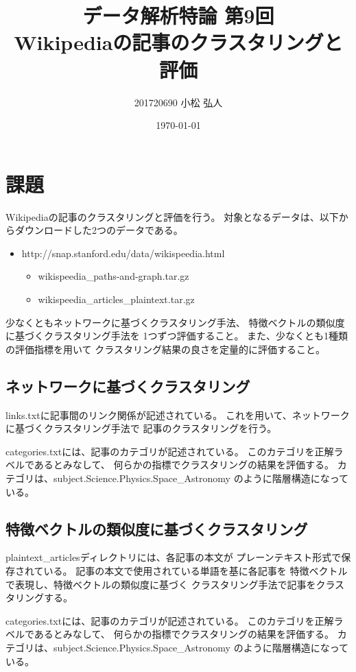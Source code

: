 \documentclass{jsarticle}
\title{データ解析特論 第9回\\Wikipediaの記事のクラスタリングと評価}
\author{201720690 小松 弘人}
\date{\today}
\makeatletter
\def\maketitle{%
    \null
    \thispagestyle{empty}%
    \vfill
    \begin{center}\leavevmode
        \normalfont
        {\LARGE \@title\par}%
        \vskip 1cm
        {\Large \@author\par}%
        \vskip 1cm
        {\Large \@date\par}%
    \end{center}%
    \vfill
    \null
    \@thanks%
    \cleardoublepage
}
\makeatother
\begin{document}
\maketitle
\thispagestyle{empty}
\section{課題}
Wikipediaの記事のクラスタリングと評価を行う。
対象となるデータは、以下からダウンロードした2つのデータである。
\begin{itemize}
    \item http://snap.stanford.edu/data/wikispeedia.html
    \begin{itemize}
        \item wikispeedia\_paths-and-graph.tar.gz
        \item wikispeedia\_articles\_plaintext.tar.gz
    \end{itemize}
\end{itemize}
少なくともネットワークに基づくクラスタリング手法、
特徴ベクトルの類似度に基づくクラスタリング手法を
1つずつ評価すること。
また、少なくとも1種類の評価指標を用いて
クラスタリング結果の良さを定量的に評価すること。

\subsection{ネットワークに基づくクラスタリング}
links.txtに記事間のリンク関係が記述されている。
これを用いて、ネットワークに基づくクラスタリング手法で
記事のクラスタリングを行う。

categories.txtには、記事のカテゴリが記述されている。
このカテゴリを正解ラベルであるとみなして、
何らかの指標でクラスタリングの結果を評価する。
カテゴリは、subject.Science.Physics.Space\_Astronomy
のように階層構造になっている。

\subsection{特徴ベクトルの類似度に基づくクラスタリング}
plaintext\_articlesディレクトリには、各記事の本文が
プレーンテキスト形式で保存されている。
記事の本文で使用されている単語を基に各記事を
特徴ベクトルで表現し、特徴ベクトルの類似度に基づく
クラスタリング手法で記事をクラスタリングする。

categories.txtには、記事のカテゴリが記述されている。
このカテゴリを正解ラベルであるとみなして、
何らかの指標でクラスタリングの結果を評価する。
カテゴリは、subject.Science.Physics.Space\_Astronomy
のように階層構造になっている。
\end{document}
